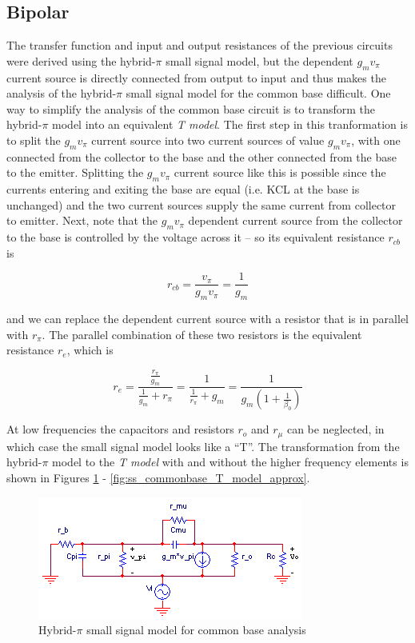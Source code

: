 \subsection{Bipolar}
\par
The transfer function and input and output resistances of the previous circuits were derived using the hybrid-$\pi$ small signal model, but the dependent $g_{m}v_{\pi}$ current source is directly connected from output to input and thus makes the analysis of the hybrid-$\pi$ small signal model for the common base difficult. One way to simplify the analysis of the common base circuit is to transform the hybrid-$\pi$ model into an equivalent \textsl{T model}. The first step in this tranformation is to split the $g_{m}v_{\pi}$ current source into two current sources of value $g_{m}v_{\pi}$, with one connected from the collector to the base and the other connected from the base to the emitter. Splitting the $g_{m}v_{\pi}$ current source like this is possible since the currents entering and exiting the base are equal (i.e. KCL at the base is unchanged) and the two current sources supply the same current from collector to emitter. Next, note that the $g_{m}v_{\pi}$ dependent current source from the collector to the base is controlled by the voltage across it -- so its equivalent resistance $r_{cb}$ is

\begin{equation}
r_{cb} = \frac{v_{\pi}}{g_{m}v_{\pi}} = \frac{1}{g_{m}}
\end{equation}

\noindent and we can replace the dependent current source with a resistor that is in parallel with $r_{\pi}$. The parallel combination of these two resistors is the equivalent resistance $r_{e}$, which is

\begin{equation}
r_{e} = \frac{\frac{r_{\pi}}{g_{m}}}{\frac{1}{g_{m}}+r_{\pi}} = \frac{1}{\frac{1}{r_{\pi}}+g_{m}} = \frac{1}{g_{m}\left(1+\frac{1}{\beta_{0}}\right)}
\end{equation}

At low frequencies the capacitors and resistors $r_{o}$ and $r_{\mu}$ can be neglected, in which case the small signal model looks like a ``T''. The transformation from the hybrid-$\pi$ model to the \textsl{T model} with and without the higher frequency elements is shown in Figures \ref{fig:ss_commonbase_hybrid_pi} - \ref{fig:ss_commonbase_T_model_approx}. \autocite[183-184]{analysis-design-analog-ics}

\begin{figure}[h]
	\centering
		\includegraphics{schematics/ss_commonbase_hybrid_pi.PNG}
	\caption{Hybrid-$\pi$ small signal model for common base analysis}
	\label{fig:ss_commonbase_hybrid_pi}
\end{figure}

